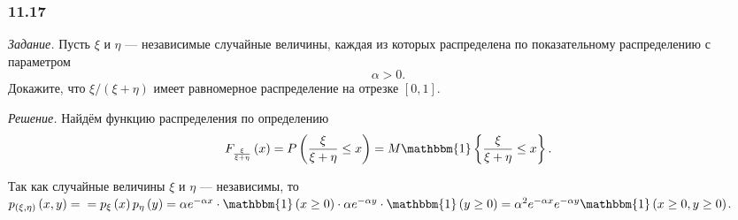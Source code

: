 \subsubsection*{11.17}

\textit{Задание.} Пусть $ \xi $ и $ \eta $ --- независимые случайные величины, каждая из которых распределена по показательному распределению с параметром
$$ \alpha > 0.$$
Докажите, что $ \xi/ \left( \xi + \eta \right) $ имеет равномерное распределение на отрезке $ \left[ 0, 1 \right] $.

\textit{Решение.} Найдём функцию распределения по определению
$$F_{ \frac{ \xi }{ \xi + \eta }} \left( x \right) =
P \left( \frac{ \xi }{ \xi + \eta } \leq x \right) =
M \mathbbm{1} \left\{ \frac{ \xi }{ \xi + \eta } \leq x \right\}.$$

Так как случайные величины $ \xi $ и $ \eta $ --- независимы, то
$p_{ \left( \xi, \eta \right) } \left( x, y \right) = \\
= p_{ \xi } \left( x \right) p_{ \eta } \left( y \right) =
\alpha e^{- \alpha x} \cdot \mathbbm{1} \left( x \geq 0 \right) \cdot \alpha e^{- \alpha y} \cdot \mathbbm{1} \left( y \geq 0 \right) =
\alpha^2 e^{- \alpha x} e^{- \alpha y} \mathbbm{1} \left( x \geq 0, y \geq 0 \right) $.


